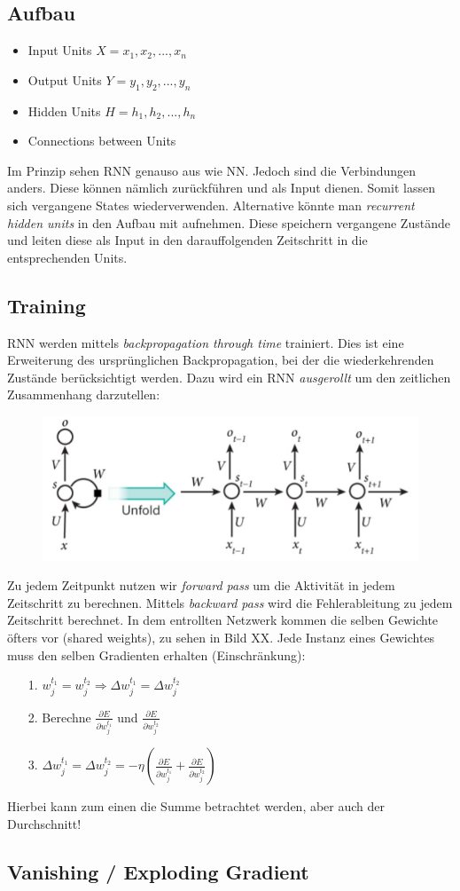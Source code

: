 \subsection{Aufbau}
\label{ssect:rnn-aufbau}
\begin{itemize}
	\item Input Units $X = x_1, x_2, ..., x_n$
	\item Output Units $Y = y_1, y_2, ..., y_n$
	\item Hidden Units $H = h_1, h_2, ..., h_n$
	\item Connections between Units
\end{itemize}
Im Prinzip sehen RNN genauso aus wie NN. Jedoch sind die Verbindungen anders. Diese können nämlich zurückführen und als Input dienen. Somit lassen sich vergangene States wiederverwenden. Alternative könnte man \textit{recurrent hidden units} in den Aufbau mit aufnehmen. Diese speichern vergangene Zustände und leiten diese als Input in den darauffolgenden Zeitschritt in die entsprechenden Units.
\subsection{Training}
\label{ssect:rnn-training}
RNN werden mittels \textit{backpropagation through time} trainiert. Dies ist eine Erweiterung des ursprünglichen Backpropagation, bei der die wiederkehrenden Zustände berücksichtigt werden. Dazu wird ein RNN \textit{ausgerollt} um den zeitlichen Zusammenhang darzutellen:
\begin{figure}
\includegraphics[scale=0.6]{unfold-example}
\end{figure}
Zu jedem Zeitpunkt nutzen wir \textit{forward pass} um die Aktivität in jedem Zeitschritt zu berechnen. Mittels \textit{backward pass} wird die Fehlerableitung zu jedem Zeitschritt berechnet.
In dem entrollten Netzwerk kommen die selben Gewichte öfters vor (shared weights), zu sehen in Bild XX. Jede Instanz eines Gewichtes muss den selben Gradienten erhalten (Einschränkung):
\begin{itemize}
	\item[1.]$w_j^{t_1} = w_j^{t_2} \Rightarrow \Delta w_j^{t_1} = \Delta w_j^{t_2}$
	\item[2.]Berechne $\frac{\partial E}{\partial w_j^{t_1}}$ und $\frac{\partial E}{\partial w_j^{t_2}}$
	\item[3.] $\Delta w_j^{t_1} = \Delta w_j^{t_2} = -\eta \left(\frac{\partial E}{\partial w_j^{t_1}} + \frac{\partial E}{\partial w_j^{t_2}}\right)$
\end{itemize}
Hierbei kann zum einen die Summe betrachtet werden, aber auch der Durchschnitt!

\subsection{Vanishing / Exploding Gradient}
\label{ssect:vanishing-exploding-gradient}


\newpage